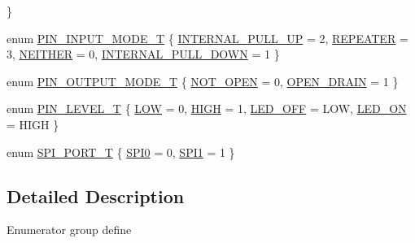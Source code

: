 \begin{DoxyCompactItemize}
 \}
\item 
enum \hyperlink{group___enumeration_ga9f8f32709b482732d6e377ff26da36ef}{P\-I\-N\-\_\-\-I\-N\-P\-U\-T\-\_\-\-M\-O\-D\-E\-\_\-\-T} \{ \hyperlink{group___enumeration_gga9f8f32709b482732d6e377ff26da36efa781a7f23ae9b0dbdc6edfdcfd3be75df}{I\-N\-T\-E\-R\-N\-A\-L\-\_\-\-P\-U\-L\-L\-\_\-\-U\-P} = 2, 
\hyperlink{group___enumeration_gga9f8f32709b482732d6e377ff26da36efa415b70b8108c51e396b88eeeaa0ffb1a}{R\-E\-P\-E\-A\-T\-E\-R} = 3, 
\hyperlink{group___enumeration_gga9f8f32709b482732d6e377ff26da36efa013572cb02b52b1022858df73a528a08}{N\-E\-I\-T\-H\-E\-R} = 0, 
\hyperlink{group___enumeration_gga9f8f32709b482732d6e377ff26da36efa1d483952a85ba6abceffda2c06623326}{I\-N\-T\-E\-R\-N\-A\-L\-\_\-\-P\-U\-L\-L\-\_\-\-D\-O\-W\-N} = 1
 \}
\item 
enum \hyperlink{group___enumeration_gac16e35b75166ad7286b8bb78bd244ed2}{P\-I\-N\-\_\-\-O\-U\-T\-P\-U\-T\-\_\-\-M\-O\-D\-E\-\_\-\-T} \{ \hyperlink{group___enumeration_ggac16e35b75166ad7286b8bb78bd244ed2afd68b1a66f2a33ce77d4f6c7f8fc998a}{N\-O\-T\-\_\-\-O\-P\-E\-N} = 0, 
\hyperlink{group___enumeration_ggac16e35b75166ad7286b8bb78bd244ed2aa90b62c376675b218528e2b0b0a7f123}{O\-P\-E\-N\-\_\-\-D\-R\-A\-I\-N} = 1
 \}
\item 
enum \hyperlink{group___enumeration_ga6f24594071a026b31238ab8cb80d6a80}{P\-I\-N\-\_\-\-L\-E\-V\-E\-L\-\_\-\-T} \{ \hyperlink{group___enumeration_gga6f24594071a026b31238ab8cb80d6a80a6a226f4143ca3b18999551694cdb72a8}{L\-O\-W} = 0, 
\hyperlink{group___enumeration_gga6f24594071a026b31238ab8cb80d6a80a0c3a1dacf94061154b3ee354359c5893}{H\-I\-G\-H} = 1, 
\hyperlink{group___enumeration_gga6f24594071a026b31238ab8cb80d6a80afc0ca8cc6cbe215fd3f1ae6d40255b40}{L\-E\-D\-\_\-\-O\-F\-F} = L\-O\-W, 
\hyperlink{group___enumeration_gga6f24594071a026b31238ab8cb80d6a80add01b80eb93658fb4cf7eb9aceb89a1d}{L\-E\-D\-\_\-\-O\-N} = H\-I\-G\-H
 \}
\item 
enum \hyperlink{group___enumeration_ga1adbe6bf70e3880dc6b9f86e58bb7f98}{S\-P\-I\-\_\-\-P\-O\-R\-T\-\_\-\-T} \{ \hyperlink{group___enumeration_gga1adbe6bf70e3880dc6b9f86e58bb7f98a7add1e0588a075d9385b10fcbb2010f4}{S\-P\-I0} = 0, 
\hyperlink{group___enumeration_gga1adbe6bf70e3880dc6b9f86e58bb7f98add83ddb396fbcb33f2d61248e5c4a185}{S\-P\-I1} = 1
 \}
\end{DoxyCompactItemize}


\subsection{Detailed Description}
Enumerator group define 

